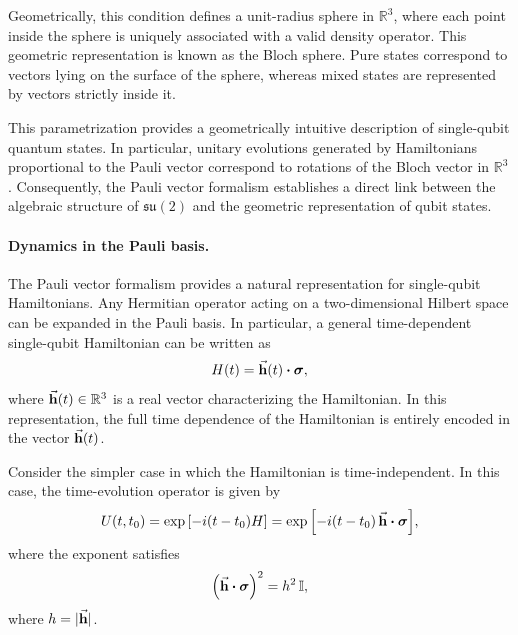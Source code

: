 Geometrically, this condition defines a unit-radius sphere in $\mathbb{R}^3$, where each point inside the sphere is uniquely associated with a valid density operator. This geometric representation is known as the Bloch sphere. Pure states correspond to vectors lying on the surface of the sphere, whereas mixed states are represented by vectors strictly inside it.

This parametrization provides a geometrically intuitive description of single-qubit quantum states. In particular, unitary evolutions generated by Hamiltonians proportional to the Pauli vector correspond to rotations of the Bloch vector in $\mathbb{R}^3$. Consequently, the Pauli vector formalism establishes a direct link between the algebraic structure of $\mathfrak{su}(2)$ and the geometric representation of qubit states.

\paragraph{Dynamics in the Pauli basis.}
The Pauli vector formalism provides a natural representation for single-qubit Hamiltonians. Any Hermitian operator acting on a two-dimensional Hilbert space can be expanded in the Pauli basis. In particular, a general time-dependent single-qubit Hamiltonian can be written as
\begin{equation}
    H(t) = \va{h}(t) \vdot \vb*{\sigma},
\end{equation}
where $\va{h}(t) \in \mathbb{R}^3$ is a real vector characterizing the Hamiltonian. In this representation, the full time dependence of the Hamiltonian is entirely encoded in the vector $\va{h}(t)$.

Consider the simpler case in which the Hamiltonian is time-independent. In this case, the time-evolution operator is given by
\begin{equation}
    U(t,t_0) = \exp\qty[-i (t-t_0) H]
    = \exp\qty[-i (t-t_0)\, \va{h} \vdot \vb*{\sigma}],
\end{equation}
where the exponent satisfies
\begin{equation}
    \label{eq:exp-feature}
    \qty(\va{h} \vdot \vb*{\sigma})^2 = h^2\, \id,
\end{equation}
where $h = | \va{h} |$.

